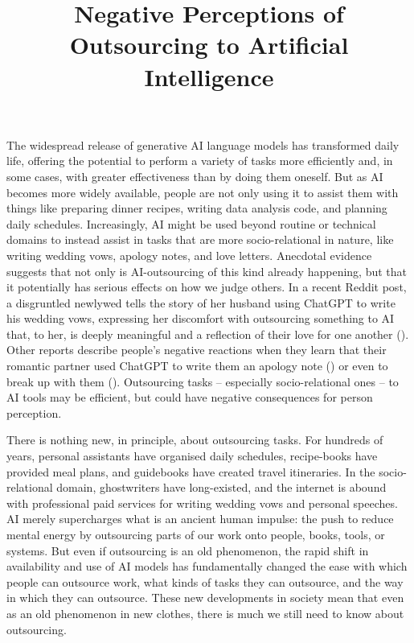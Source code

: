 \documentclass[
  man,
  floatsintext,
  longtable,
  nolmodern,
  notxfonts,
  notimes,
  colorlinks=true,linkcolor=blue,citecolor=blue,urlcolor=blue]{apa7}
\title{Negative Perceptions of Outsourcing to Artificial Intelligence}
\affiliation{
{School of Psychology, University of Kent}}
\begin{document}
\maketitle



\setcounter{secnumdepth}{-\maxdimen} %

\setlength\LTleft{0pt}

\resetlinenumber[1]



\linenumbers

The widespread release of generative AI language models has transformed
daily life, offering the potential to perform a variety of tasks more
efficiently and, in some cases, with greater effectiveness than by doing
them oneself. But as AI becomes more widely available, people are not
only using it to assist them with things like preparing dinner recipes,
writing data analysis code, and planning daily schedules. Increasingly,
AI might be used beyond routine or technical domains to instead assist
in tasks that are more socio-relational in nature, like writing wedding
vows, apology notes, and love letters. Anecdotal evidence suggests that
not only is AI-outsourcing of this kind already happening, but that it
potentially has serious effects on how we judge others. In a recent
Reddit post, a disgruntled newlywed tells the story of her husband using
ChatGPT to write his wedding vows, expressing her discomfort with
outsourcing something to AI that, to her, is deeply meaningful and a
reflection of their love for one another
(). Other reports describe
people's negative reactions when they learn that their romantic partner
used ChatGPT to write them an apology note
() or even to break up with them
(). Outsourcing tasks --
especially socio-relational ones -- to AI tools may be efficient, but
could have negative consequences for person perception.

There is nothing new, in principle, about outsourcing tasks. For
hundreds of years, personal assistants have organised daily schedules,
recipe-books have provided meal plans, and guidebooks have created
travel itineraries. In the socio-relational domain, ghostwriters have
long-existed, and the internet is abound with professional paid services
for writing wedding vows and personal speeches. AI merely supercharges
what is an ancient human impulse: the push to reduce mental energy by
outsourcing parts of our work onto people, books, tools, or systems. But
even if outsourcing is an old phenomenon, the rapid shift in
availability and use of AI models has fundamentally changed the ease
with which people can outsource work, what kinds of tasks they can
outsource, and the way in which they can outsource. These new
developments in society mean that even as an old phenomenon in new
clothes, there is much we still need to know about outsourcing.
\end{document}
